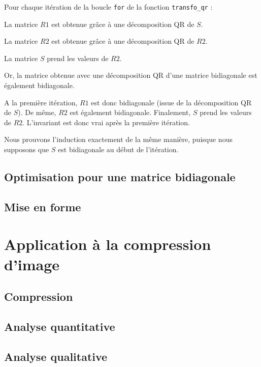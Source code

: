 \documentclass{article}
\begin{document}
Pour chaque itération de la boucle \verb|for| de la fonction \verb|transfo_qr| :
\smallskip

\noindent La matrice $R1$ est obtenue grâce à une décomposition QR de $S$.

\noindent La matrice $R2$ est obtenue grâce à une décomposition QR de $R2$.

\noindent La matrice $S$ prend les valeurs de $R2$.

\smallskip
Or, la matrice obtenue avec une décomposition QR d'une matrice bidiagonale est également bidiagonale. %

A la première itération, $R1$ est donc bidiagonale (issue de la décomposition QR de $S$). De même, $R2$ est également bidiagonale. Finalement, $S$ prend les valeurs de $R2$. L'invariant est donc vrai après la première itération.

\smallskip

Nous prouvons l'induction exactement de la même manière, puisque nous supposons que $S$ est bidiagonale au début de l'itération.

\subsection{Optimisation pour une matrice bidiagonale}
\label{ssec:opti_bidiag_qr}

\subsection{Mise en forme}
\label{ssec:mise_en_forme_qr}


\section{Application à la compression d'image}
\label{sec:appli_compr_img}

\subsection{Compression}
\label{ssec:compr_img}

\subsection{Analyse quantitative}
\label{ssec:quanti_img}

\subsection{Analyse qualitative}
\label{ssec:quali_img}
\end{document}
